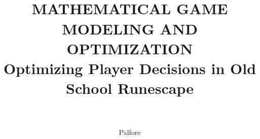 \documentclass[12pt,a4paper]{article}
\author{Palfore}
\title{
	\HRule{0.5pt}\\
	\LARGE \textbf{\uppercase{Mathematical Game Modeling and Optimization}}\\
	Optimizing Player Decisions in Old School Runescape\\
	\HRule{2pt}\\
}
\begin{document}
	\begin{titlepage}
		\maketitle
		\thispagestyle{empty}
	\end{titlepage}
\end{document}
